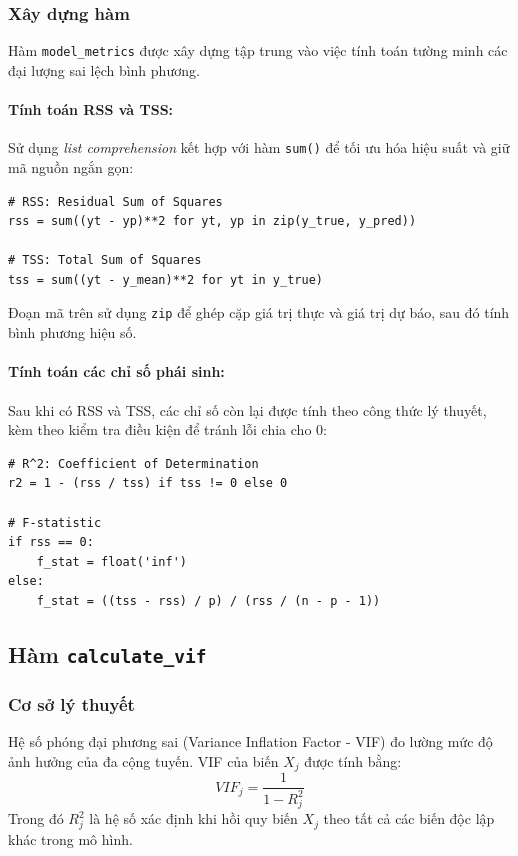 \subsubsection{Xây dựng hàm}
Hàm \texttt{model\_metrics} được xây dựng tập trung vào việc tính toán tường minh các đại lượng sai lệch bình phương.

\paragraph{Tính toán RSS và TSS:}
Sử dụng \textit{list comprehension} kết hợp với hàm \texttt{sum()} để tối ưu hóa hiệu suất và giữ mã nguồn ngắn gọn:
\begin{lstlisting}[style = Python, caption=Tính toán RSS và TSS]
# RSS: Residual Sum of Squares
rss = sum((yt - yp)**2 for yt, yp in zip(y_true, y_pred))

# TSS: Total Sum of Squares
tss = sum((yt - y_mean)**2 for yt in y_true)
\end{lstlisting}
Đoạn mã trên sử dụng \texttt{zip} để ghép cặp giá trị thực và giá trị dự báo, sau đó tính bình phương hiệu số.

\paragraph{Tính toán các chỉ số phái sinh:}
Sau khi có RSS và TSS, các chỉ số còn lại được tính theo công thức lý thuyết, kèm theo kiểm tra điều kiện để tránh lỗi chia cho 0:
\begin{lstlisting}[style = Python, caption=Tính toán R2 và F-statistic]
# R^2: Coefficient of Determination
r2 = 1 - (rss / tss) if tss != 0 else 0

# F-statistic
if rss == 0:
    f_stat = float('inf')
else:
    f_stat = ((tss - rss) / p) / (rss / (n - p - 1))
\end{lstlisting}

\subsection{Hàm \texttt{calculate\_vif}}

\subsubsection{Cơ sở lý thuyết}
Hệ số phóng đại phương sai (Variance Inflation Factor - VIF) đo lường mức độ ảnh hưởng của đa cộng tuyến. VIF của biến $X_j$ được tính bằng:
\begin{equation}
    VIF_j = \frac{1}{1 - R_j^2}
\end{equation}
Trong đó $R_j^2$ là hệ số xác định khi hồi quy biến $X_j$ theo tất cả các biến độc lập khác trong mô hình.

